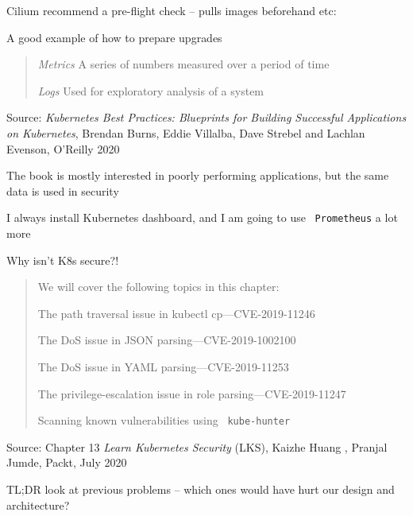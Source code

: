 \documentclass[Screen16to9,17pt]{foils}
\begin{document}
\begin{list2}
\item Cilium recommend a pre-flight check -- pulls images beforehand etc:\\
\item A good example of how to prepare upgrades
\end{list2}


\begin{quote}
\emph{Metrics} A series of numbers measured over a period of time

\emph{Logs} Used for exploratory analysis of a system
\end{quote}
Source: \emph{Kubernetes Best Practices: Blueprints for Building Successful Applications on Kubernetes}, Brendan Burns, Eddie Villalba, Dave Strebel and Lachlan Evenson, O'Reilly 2020

\begin{list2}
\item The book is mostly interested in poorly performing applications, but the same data is used in security
\item I always install Kubernetes dashboard, and I am going to use \faWrench\ \verb+Prometheus+ a lot more
\end{list2}


Why isn't K8s secure?!
\begin{quote}
We will cover the following topics in this chapter:
\begin{list2}
\item The path traversal issue in kubectl cp—CVE-2019-11246
\item The DoS issue in JSON parsing—CVE-2019-1002100
\item The DoS issue in YAML parsing—CVE-2019-11253
\item The privilege-escalation issue in role parsing—CVE-2019-11247
\item Scanning known vulnerabilities using \faWrench\ \verb+kube-hunter+
\end{list2}
\end{quote}
Source: Chapter 13 \emph{Learn Kubernetes Security} (LKS), Kaizhe Huang , Pranjal Jumde, Packt, July 2020

TL;DR look at previous problems -- which ones would have hurt our design and architecture?
\end{document}
